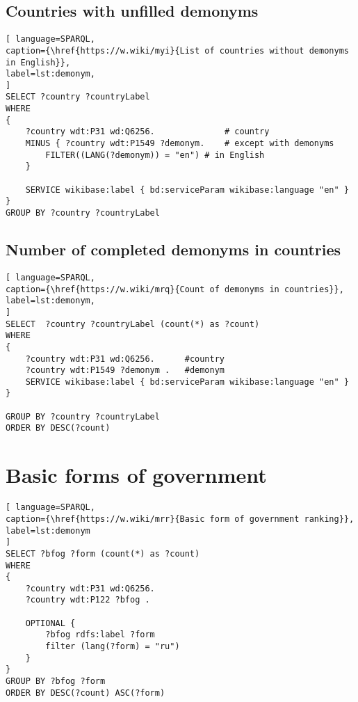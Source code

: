 \subsection{Countries with unfilled demonyms}

\begin{lstlisting}[ language=SPARQL, 
caption={\href{https://w.wiki/myi}{List of countries without demonyms in English}},
label=lst:demonym, 
]
SELECT ?country ?countryLabel 
WHERE
{
	?country wdt:P31 wd:Q6256.              # country
	MINUS { ?country wdt:P1549 ?demonym.    # except with demonyms
		FILTER((LANG(?demonym)) = "en") # in English
	}    
	
	SERVICE wikibase:label { bd:serviceParam wikibase:language "en" }
}
GROUP BY ?country ?countryLabel
\end{lstlisting}

\subsection{Number of completed demonyms in countries}

\begin{lstlisting}[ language=SPARQL, 
caption={\href{https://w.wiki/mrq}{Count of demonyms in countries}},
label=lst:demonym, 
]
SELECT  ?country ?countryLabel (count(*) as ?count)
WHERE
{
	?country wdt:P31 wd:Q6256.      #country
	?country wdt:P1549 ?demonym .   #demonym
	SERVICE wikibase:label { bd:serviceParam wikibase:language "en" }
}

GROUP BY ?country ?countryLabel 
ORDER BY DESC(?count)
\end{lstlisting}

\section{Basic forms of government}

\begin{lstlisting}[ language=SPARQL, 
caption={\href{https://w.wiki/mrr}{Basic form of government ranking}},
label=lst:demonym
]
SELECT ?bfog ?form (count(*) as ?count)
WHERE 
{
	?country wdt:P31 wd:Q6256.
	?country wdt:P122 ?bfog .
	
	OPTIONAL {
		?bfog rdfs:label ?form
		filter (lang(?form) = "ru")
	}
}
GROUP BY ?bfog ?form
ORDER BY DESC(?count) ASC(?form)
\end{lstlisting}


